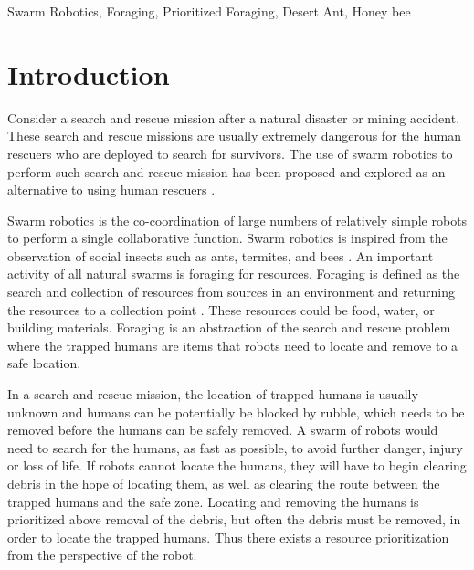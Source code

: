 \documentclass[preprint,12pt]{elsarticle}
\begin{document}
\begin{frontmatter}
    \begin{keyword}
    
    
    Swarm Robotics, Foraging, Prioritized Foraging, Desert Ant, Honey bee
    
    \end{keyword}
    
    \end{frontmatter}
    
    
\section{Introduction}
\label{introduction}


Consider a search and rescue mission after a natural disaster or mining accident. These search and rescue missions are usually extremely dangerous for the human rescuers who are deployed to search for survivors. The use of swarm robotics to perform such search and rescue mission has been proposed and explored as an alternative to using human rescuers \cite{murphy2008search,naghsh2008analysis}.

Swarm robotics is the co-coordination of large numbers of  relatively simple robots to perform a single collaborative function. Swarm robotics is inspired from the observation of social insects such as ants, termites, and bees \cite{dorigo2004swarm}. An important activity of all natural swarms is foraging for resources. Foraging is defined as the search and collection of resources from sources in an environment and returning the resources to a collection point \cite{winfield2009foraging}. These resources could be food, water, or building materials. Foraging is an abstraction of the search and rescue problem where the trapped humans are items that robots need to locate and remove to a safe location. 

In a search and rescue mission, the location of trapped humans is usually unknown and humans can be potentially be blocked by rubble, which needs to be removed before the humans can be safely removed. A swarm of robots would need to search for the humans, as fast as possible, to avoid further danger, injury or loss of life. If robots cannot locate the humans, they will have to begin clearing debris in the hope of locating them, as well as clearing the route between the trapped humans and the safe zone. Locating and removing the humans is prioritized above removal of the debris, but often the debris must be removed, in order to locate the trapped humans. Thus there exists a resource prioritization from the perspective of the robot.
\end{document}
